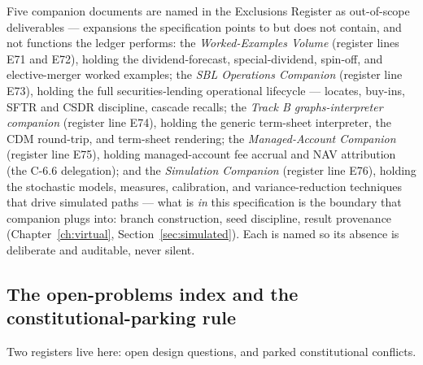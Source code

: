 \documentclass[11pt,a4paper]{article}
\begin{document}
Five companion documents are named in the Exclusions Register as out-of-scope
deliverables --- expansions the specification points to but does not contain, and not
functions the ledger performs: the \emph{Worked-Examples Volume} (register lines E71 and
E72), holding the dividend-forecast, special-dividend, spin-off, and elective-merger
worked examples; the \emph{SBL Operations Companion} (register line E73), holding the full
securities-lending operational lifecycle --- locates, buy-ins, SFTR and CSDR discipline,
cascade recalls; the \emph{Track B graphs-interpreter companion} (register line E74),
holding the generic term-sheet interpreter, the CDM round-trip, and term-sheet rendering;
the \emph{Managed-Account Companion} (register line E75), holding managed-account fee
accrual and NAV attribution (the C-6.6 delegation); and the \emph{Simulation Companion}
(register line E76), holding the stochastic models, measures, calibration, and
variance-reduction techniques that drive simulated paths --- what is \emph{in} this
specification is the boundary that companion plugs into: branch construction, seed
discipline, result provenance (Chapter~\ref{ch:virtual}, Section~\ref{sec:simulated}).
Each is named so its absence is deliberate and auditable, never silent.

\subsection{The open-problems index and the constitutional-parking rule}

Two registers live here: open design questions, and parked constitutional conflicts.
\end{document}
